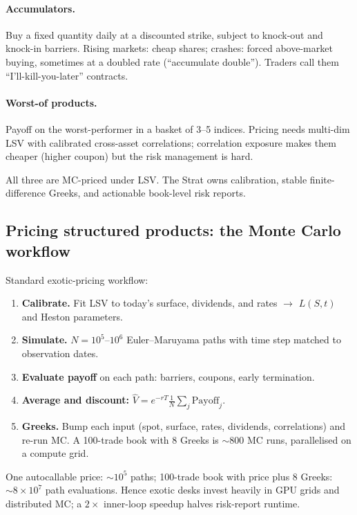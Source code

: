 \paragraph{Accumulators.}
Buy a fixed quantity daily at a discounted strike, subject to knock-out
and knock-in barriers. Rising markets: cheap shares; crashes: forced
above-market buying, sometimes at a doubled rate (``accumulate
double''). Traders call them ``I'll-kill-you-later'' contracts.

\paragraph{Worst-of products.}
Payoff on the worst-performer in a basket of 3--5 indices. Pricing
needs multi-dim LSV with calibrated cross-asset correlations;
correlation exposure makes them cheaper (higher coupon) but the risk
management is hard.

\noindent
All three are MC-priced under LSV. The Strat owns calibration, stable
finite-difference Greeks, and actionable book-level risk reports.

\subsection{Pricing structured products: the Monte Carlo workflow}
\label{subsec:structured_mc}

Standard exotic-pricing workflow:
\begin{enumerate}
  \item \textbf{Calibrate.} Fit LSV to today's surface, dividends, and
    rates $\to$ $L(S,t)$ and Heston parameters.
  \item \textbf{Simulate.} $N=10^5$--$10^6$ Euler--Maruyama paths
    with time step matched to observation dates.
  \item \textbf{Evaluate payoff} on each path: barriers, coupons,
    early termination.
  \item \textbf{Average and discount:}
    $\hat V=e^{-rT}\tfrac{1}{N}\sum_j\text{Payoff}_j$.
  \item \textbf{Greeks.} Bump each input (spot, surface, rates,
    dividends, correlations) and re-run MC. A 100-trade book with 8
    Greeks is $\sim 800$ MC runs, parallelised on a compute grid.
\end{enumerate}

\begin{keyfactbox}
One autocallable price: $\sim 10^5$ paths; 100-trade book with price
plus 8 Greeks: $\sim 8\times 10^7$ path evaluations. Hence exotic
desks invest heavily in GPU grids and distributed MC; a $2\times$
inner-loop speedup halves risk-report runtime.
\end{keyfactbox}


